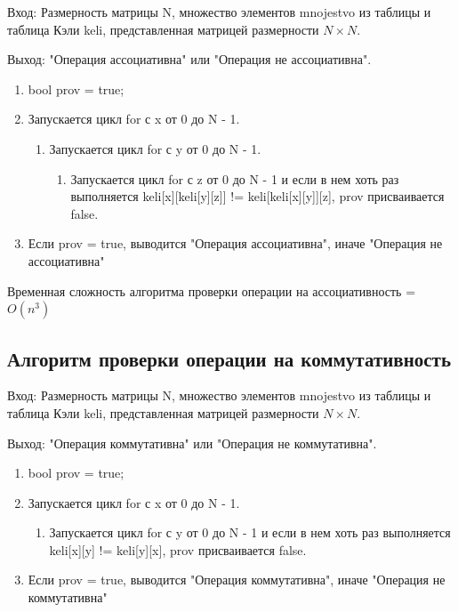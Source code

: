 \documentclass[bachelor, och, labwork]{shiza}
\begin{document}
	$\textit{Вход:}$ Размерность матрицы N, множество элементов mnojestvo из таблицы и таблица Кэли keli, представленная матрицей размерности $N \times N$.
	
	$\textit{Выход:}$  "Операция ассоциативна" или "Операция не ассоциативна".
	
	\begin{enumerate} 
		\item bool prov = true;
		\item Запускается цикл for с x от 0 до N - 1.
		\begin{enumerate} 
			\item Запускается цикл for с y от 0 до N - 1.
			\begin{enumerate} 
				\item Запускается цикл for с z от 0 до N - 1 и если в нем хоть раз выполняется keli[x][keli[y][z]] != keli[keli[x][y]][z], prov присваивается false.
			\end{enumerate} 
		\end{enumerate}
		\item Если prov = true, выводится "Операция ассоциативна", иначе "Операция не ассоциативна"
	\end{enumerate} 
	
	Временная сложность алгоритма проверки операции на ассоциативность = $O(n^3)$
	
	\subsection{Алгоритм проверки операции на коммутативность}
	
	$\textit{Вход:}$ Размерность матрицы N, множество элементов mnojestvo из таблицы и таблица Кэли keli, представленная матрицей размерности $N \times N$.
	
	$\textit{Выход:}$  "Операция коммутативна" или "Операция не коммутативна".
	
	\begin{enumerate} 
		\item bool prov = true;
		\item Запускается цикл for с x от 0 до N - 1.
		\begin{enumerate} 
			\item Запускается цикл for с y от 0 до N - 1 и если в нем хоть раз выполняется keli[x][y] != keli[y][x], prov присваивается false.
		\end{enumerate}
		\item Если prov = true, выводится "Операция коммутативна", иначе "Операция не коммутативна"
	\end{enumerate} 
	
\end{document}

